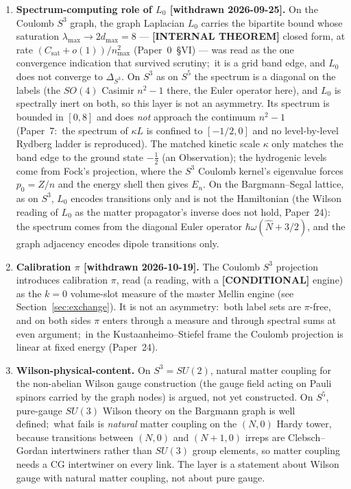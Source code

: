 \documentclass[aps,pra,twocolumn,superscriptaddress,longbibliography]{revtex4-2}
\newcommand{\gvc}[2]{#2}
\begin{document}
\begin{enumerate}
\item \textbf{Spectrum-computing role of $L_0$ [withdrawn 2026-09-25].}  On
the Coulomb $S^3$ graph, the graph Laplacian $L_0$ carries the bipartite
bound whose saturation $\lambda_{\max} \to 2 d_{\max} = 8$ ---
\textbf{[INTERNAL THEOREM]} closed form, at rate
$(C_{\mathrm{sat}} + o(1))/n_{\max}^2$ (Paper~0~\S VI) --- was read as the one
convergence indication that survived scrutiny;\ \gvc{graph-s3-wall}{it is a grid band edge,
and $L_0$ does not converge to $\Delta_{S^3}$}.  On $S^3$ as on $S^5$ the
spectrum is a diagonal on the labels (the $SO(4)$ Casimir $n^2-1$ there,
the Euler operator here), and $L_0$ is spectrally inert on both, so this
layer is not an asymmetry. Its spectrum is
bounded in $[0, 8]$ and does \emph{not} approach the continuum
$n^2 - 1$ (Paper~7:\ the
spectrum of $\kappa L$ is confined to $[-1/2, 0]$ and no level-by-level
Rydberg ladder is reproduced). The matched kinetic scale $\kappa$ only
matches the band edge to the ground state $-\tfrac12$ (an Observation);
the hydrogenic levels come from Fock's projection, where the $S^3$
Coulomb kernel's eigenvalue forces $p_0 = Z/n$ and the energy shell
then gives $E_n$.  On
the Bargmann--Segal lattice, as on $S^3$, $L_0$ encodes transitions
only and is not the Hamiltonian (the Wilson reading of $L_0$ as the
matter propagator's inverse does not hold, Paper~24): the spectrum
comes from the diagonal Euler
operator $\hbar \omega(\hat{N} + 3/2)$, and the graph adjacency
encodes dipole transitions only.

\item \textbf{Calibration $\pi$ [withdrawn 2026-10-19].}  The Coulomb
$S^3$ projection introduces calibration $\pi$, read (a reading, with a
\textbf{[CONDITIONAL]} engine) as the $k = 0$ volume-slot measure
of the master Mellin engine (see Section~\ref{sec:exchange}).  It is
not an asymmetry:\ both label sets are $\pi$-free, and on both sides
$\pi$ enters through a measure and through spectral sums at even
argument;\ in the Kustaanheimo--Stiefel frame the Coulomb projection
is linear at fixed energy (Paper~24).

\item \textbf{Wilson-physical-content.}  On $S^3 = SU(2)$, natural
matter coupling for the non-abelian Wilson gauge construction (the
gauge field acting on Pauli spinors carried by the graph nodes) is
argued, not yet constructed.  On $S^5$, pure-gauge $SU(3)$ Wilson
theory on the Bargmann graph is well defined;\ what fails is
\emph{natural} matter coupling on the $(N, 0)$ Hardy tower, because
transitions between $(N, 0)$ and $(N + 1, 0)$ irreps are
Clebsch--Gordan intertwiners rather than $SU(3)$ group elements, so
matter coupling needs a CG intertwiner on every link.  The layer is a
statement about Wilson gauge with natural matter coupling, not about
pure gauge.


\end{enumerate}
\end{document}
